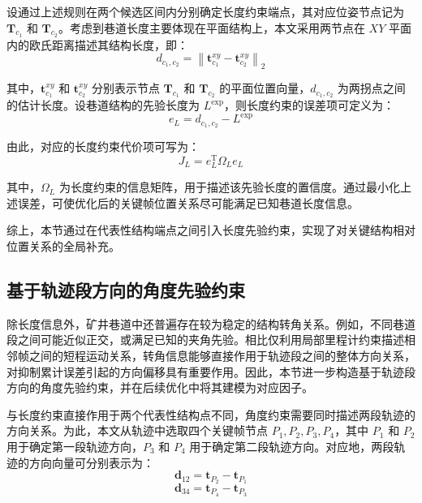 设通过上述规则在两个候选区间内分别确定长度约束端点，其对应位姿节点记为 $\mathbf{T}_{c_1}$ 和 $\mathbf{T}_{c_2}$。考虑到巷道长度主要体现在平面结构上，本文采用两节点在 $XY$ 平面内的欧氏距离描述其结构长度，即：
\begin{equation}
d_{c_1,c_2}
=
\left\|
\mathbf{t}_{c_1}^{xy}-\mathbf{t}_{c_2}^{xy}
\right\|_2
\end{equation}

其中，$\mathbf{t}_{c_1}^{xy}$ 和 $\mathbf{t}_{c_2}^{xy}$ 分别表示节点 $\mathbf{T}_{c_1}$ 和 $\mathbf{T}_{c_2}$ 的平面位置向量，$d_{c_1,c_2}$ 为两拐点之间的估计长度。设巷道结构的先验长度为 $L^{\mathrm{exp}}$，则长度约束的误差项可定义为：
\begin{equation}
e_L=d_{c_1,c_2}-L^{\mathrm{exp}}
\end{equation}

由此，对应的长度约束代价项可写为：
\begin{equation}
J_L=e_L^{\mathrm T}\Omega_L e_L
\end{equation}

其中，$\Omega_L$ 为长度约束的信息矩阵，用于描述该先验长度的置信度。通过最小化上述误差，可使优化后的关键帧位置关系尽可能满足已知巷道长度信息。

综上，本节通过在代表性结构端点之间引入长度先验约束，实现了对关键结构相对位置关系的全局补充。

\subsection{基于轨迹段方向的角度先验约束}

除长度信息外，矿井巷道中还普遍存在较为稳定的结构转角关系。例如，不同巷道段之间可能近似正交，或满足已知的夹角先验。相比仅利用局部里程计约束描述相邻帧之间的短程运动关系，转角信息能够直接作用于轨迹段之间的整体方向关系，对抑制累计误差引起的方向偏移具有重要作用。因此，本节进一步构造基于轨迹段方向的角度先验约束，并在后续优化中将其建模为对应因子。

与长度约束直接作用于两个代表性结构点不同，角度约束需要同时描述两段轨迹的方向关系。为此，本文从轨迹中选取四个关键帧节点 $P_1,P_2,P_3,P_4$，其中 $P_1$ 和 $P_2$ 用于确定第一段轨迹方向，$P_3$ 和 $P_4$ 用于确定第二段轨迹方向。对应地，两段轨迹的方向向量可分别表示为：
\begin{equation}
\mathbf{d}_{12}=\mathbf{t}_{P_2}-\mathbf{t}_{P_1}
\end{equation}
\begin{equation}
\mathbf{d}_{34}=\mathbf{t}_{P_4}-\mathbf{t}_{P_3}
\end{equation}

